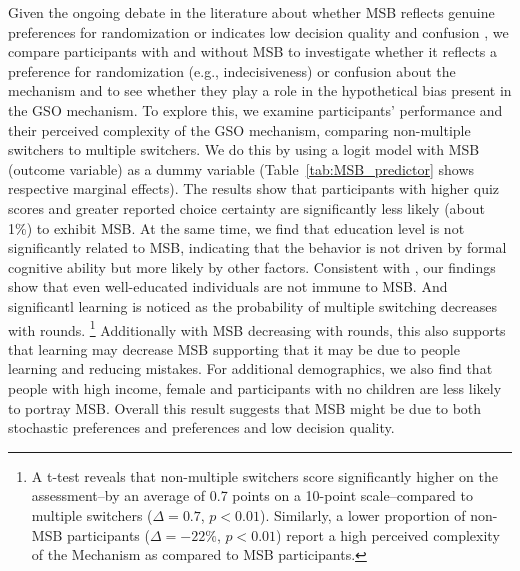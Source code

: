 \documentclass[12pt]{article}
\begin{document}
Given the ongoing debate in the literature about whether MSB reflects genuine preferences for randomization \citep{agranov2017stochastic} or indicates low decision quality and confusion \citep{charness2013experimental, yu2021multiple, filippin2016reconsideration}, we compare participants with and without MSB to investigate whether it reflects a preference for randomization (e.g., indecisiveness) or confusion about the mechanism and to see whether they play a role in the hypothetical bias present in the GSO mechanism. To explore this, we examine participants' performance and their perceived complexity of the GSO mechanism, comparing non-multiple switchers to multiple switchers. We do this by using a logit model with MSB (outcome variable) as a dummy variable (Table~\ref{tab:MSB_predictor} shows respective marginal effects). The results show that participants with higher quiz scores and greater reported choice certainty are significantly less likely (about 1\%) to exhibit MSB. At the same time, we find that education level is not significantly related to MSB, indicating that the behavior is not driven by formal cognitive ability but more likely by other factors. Consistent with \citet{yu2021multiple}, our findings show that even well-educated individuals are not immune to MSB. And significantl learning is noticed as the probability of multiple switching decreases with rounds.
\footnote{A t-test reveals that non-multiple switchers score significantly higher on the assessment--by an average of 0.7 points on a 10-point scale--compared to multiple switchers (\(\Delta = 0.7\), \(p < 0.01\)). Similarly, a lower proportion of non-MSB participants (\(\Delta = -22\%\), \(p < 0.01\)) report a high perceived complexity of the Mechanism as compared to MSB participants.} Additionally with MSB decreasing with rounds, this also supports that learning may decrease MSB supporting that it may be due to people learning and reducing mistakes. For additional demographics, we also find that people with high income, female and participants with no children are less likely to portray MSB. Overall this result suggests that MSB might be due to both stochastic preferences and preferences and low decision quality.
\end{document}
